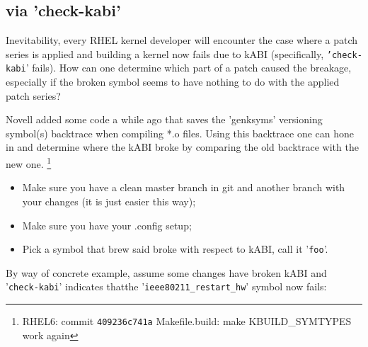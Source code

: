\documentclass[10pt,oneside,english]{book}
\begin{document}
\subsection{via 'check-kabi'}

Inevitability, every RHEL kernel developer will encounter the case
where a patch series is applied and building a kernel now fails due
to kABI (specifically, \texttt{'check-kabi}' fails). How can one determine
which part of a patch caused the breakage, especially if the broken
symbol seems to have nothing to do with the applied patch series?

Novell added some code a while ago that saves the 'genksyms' versioning
symbol(s) backtrace when compiling {*}.o files. Using this backtrace
one can hone in and determine where the kABI broke by comparing the
old backtrace with the new one. \footnote{RHEL6: commit \texttt{409236c741a} Makefile.build: make KBUILD\_SYMTYPES
work again}
\begin{itemize}
\item Make sure you have a clean master branch in git and another branch
with your changes (it is just easier this way); 
\item Make sure you have your .config setup; 
\item Pick a symbol that brew said broke with respect to kABI, call it '\texttt{foo}'. 
\end{itemize}

By way of concrete example, assume some changes have broken kABI and
'\texttt{check-kabi}' indicates that\newline the
'\texttt{ieee80211\_restart\_hw}' symbol now fails:

\end{document}
